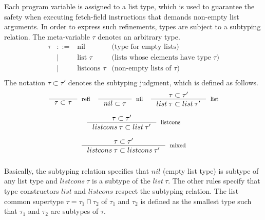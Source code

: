 \documentclass[review]{elsarticle}
\theoremstyle{definition}
\begin{document}
Each program variable is assigned to a list type, which is used to guarantee the safety when executing
fetch-field instructions that demands non-empty list arguments. In order to express such refinements, types are subject to a
subtyping relation. The meta-variable $\tau$ denotes an arbitrary type.
\[
\begin{array}{rcll}
  \tau & ::=  & \text{nil} & \text{(type for empty lists)}\\
       & \mid & \text{list }\tau & \text{(lists whose elements have type $\tau$)}\\
       & \mid & \text{listcons }\tau & \text{(non-empty lists of $\tau$)}\\
\end{array}
\]
The notation $\tau \subset \tau'$
denotes the subtyping judgment, which is defined as follows.
\[
\begin{array}{ccc}
  \inference{}
            {\tau\subset \tau}
            [refl]
  &
  \inference{}
            {nil \subset \tau}
            [nil]
  &
  \inference{\tau \subset \tau'}
            {list\:\tau\subset list\:\tau'}
            [list]\\\\
  \multicolumn{3}{c}{
  \inference{\tau \subset \tau'}
            {listcons\:\tau\subset list\:\tau'}
            [listcons]} \\\\
            \multicolumn{3}{c}{
            \inference{\tau \subset \tau'}
            {listcons\:\tau\subset listcons\:\tau'}
            [mixed]} \\\\
\end{array}
\]
Basically, the subtyping relation specifies that $nil$ (empty list type) is
subtype of any list type and $listcons\:\tau$ is a subtype of the $list\:\tau$.
The other rules specify that type constructors $list$ and $listcons$ respect
the subtyping relation. The list common supertype $\tau = \tau_1 \sqcap \tau_2$ of
$\tau_1$ and $\tau_2$ is defined as the smallest type such that $\tau_1$ and $\tau_2$
are subtypes of $\tau$.
\end{document}
